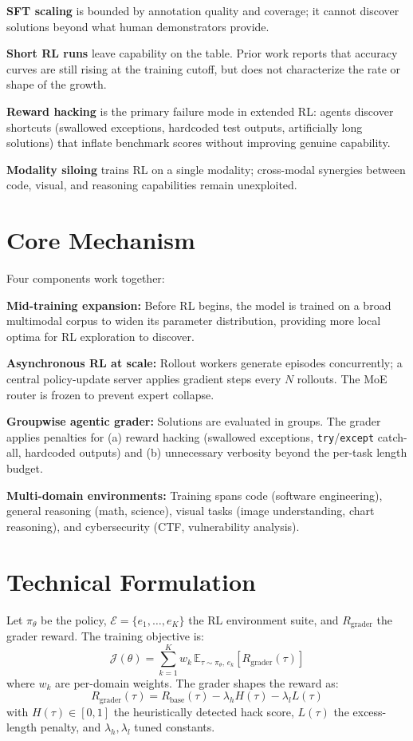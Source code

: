 \documentclass[10pt,twocolumn]{article}
\begin{document}
\textbf{SFT scaling} is bounded by annotation quality and coverage; it cannot
discover solutions beyond what human demonstrators provide.

\textbf{Short RL runs} leave capability on the table. Prior work reports that
accuracy curves are still rising at the training cutoff, but does not characterize
the rate or shape of the growth.

\textbf{Reward hacking} is the primary failure mode in extended RL: agents discover
shortcuts (swallowed exceptions, hardcoded test outputs, artificially long solutions)
that inflate benchmark scores without improving genuine capability.

\textbf{Modality siloing} trains RL on a single modality; cross-modal synergies
between code, visual, and reasoning capabilities remain unexploited.

\section{Core Mechanism}

Four components work together:

\textbf{Mid-training expansion:} Before RL begins, the model is trained on a broad
multimodal corpus to widen its parameter distribution, providing more local optima for
RL exploration to discover.

\textbf{Asynchronous RL at scale:} Rollout workers generate episodes concurrently;
a central policy-update server applies gradient steps every $N$ rollouts. The MoE
router is frozen to prevent expert collapse.

\textbf{Groupwise agentic grader:} Solutions are evaluated in groups. The grader
applies penalties for (a) reward hacking (swallowed exceptions, \texttt{try}/\texttt{except}
catch-all, hardcoded outputs) and (b) unnecessary verbosity beyond the per-task
length budget.

\textbf{Multi-domain environments:} Training spans code (software engineering),
general reasoning (math, science), visual tasks (image understanding, chart
reasoning), and cybersecurity (CTF, vulnerability analysis).

\section{Technical Formulation}

Let $\pi_\theta$ be the policy, $\mathcal{E} = \{e_1, \ldots, e_K\}$ the RL
environment suite, and $R_{\text{grader}}$ the grader reward. The training
objective is:
\[
\mathcal{J}(\theta) = \sum_{k=1}^K w_k\,\mathbb{E}_{\tau\sim\pi_\theta,\,e_k}\!
\left[R_{\text{grader}}(\tau)\right]
\]
where $w_k$ are per-domain weights. The grader shapes the reward as:
\[
R_{\text{grader}}(\tau) = R_{\text{base}}(\tau)
  - \lambda_h H(\tau) - \lambda_l L(\tau)
\]
with $H(\tau) \in [0,1]$ the heuristically detected hack score,
$L(\tau)$ the excess-length penalty, and $\lambda_h,\lambda_l$ tuned constants.
\end{document}

